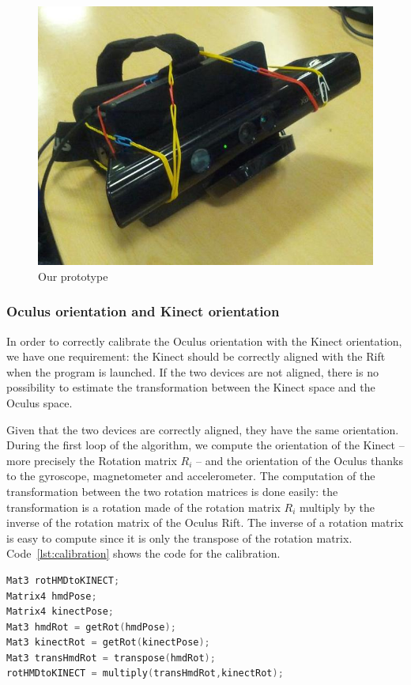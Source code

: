 \documentclass[12pt, twoside]{article}
\begin{document}
\begin{figure}[!h]
  \centering
  \includegraphics[scale=0.3]{Prototype.jpg}
  \caption{\label{fig:prototype} Our prototype}
\end{figure}

\subsubsection{Oculus orientation and Kinect orientation}
In order to correctly calibrate the Oculus orientation with the Kinect orientation, we have one requirement: the Kinect should be correctly aligned with the Rift when the program is launched. If the two devices are not aligned, there is no possibility to estimate the transformation between the Kinect space and the Oculus space.

Given that the two devices are correctly aligned, they have the same orientation. During the first loop of the algorithm, we compute the orientation of the Kinect -- more precisely the Rotation matrix $R_i$ -- and the orientation of the Oculus thanks to the gyroscope, magnetometer and accelerometer. The computation of the transformation between the two rotation matrices is done easily: the transformation is a rotation made of the rotation matrix $R_i$ multiply by the inverse of the rotation matrix of the Oculus Rift. The inverse of a rotation matrix is easy to compute since it is only the transpose of the rotation matrix. Code~\ref{lst:calibration} shows the code for the calibration.

\begin{lstlisting}[language=C++, caption={C++ code for finding the transformation between the Kinect and the Rift}, label={lst:calibration}]
Mat3 rotHMDtoKINECT;
Matrix4 hmdPose;
Matrix4 kinectPose;
Mat3 hmdRot = getRot(hmdPose);
Mat3 kinectRot = getRot(kinectPose);
Mat3 transHmdRot = transpose(hmdRot);
rotHMDtoKINECT = multiply(transHmdRot,kinectRot);
\end{lstlisting}
\end{document}
